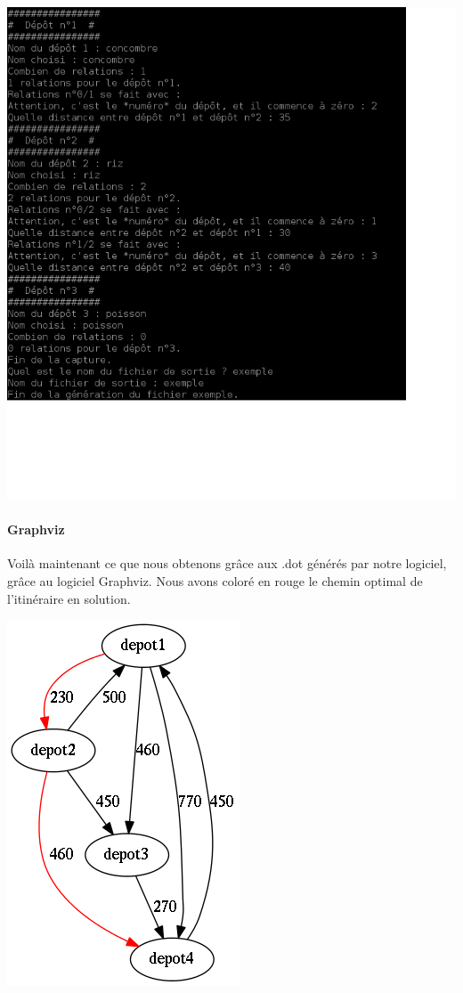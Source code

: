 \documentclass[12pt,a4paper]{report}
\begin{document}
\begin{center}
\includegraphics[scale=0.5]{capture6.png}
\label{fig8}
\end{center}

\paragraph{Graphviz}
Voilà maintenant ce que nous obtenons grâce aux .dot générés par notre logiciel, grâce au logiciel Graphviz. Nous avons coloré en rouge le chemin optimal de l'itinéraire en solution.

\begin{center}
\includegraphics[scale=0.5]{output.png}
\label{fig9}
\end{center}
\end{document}
